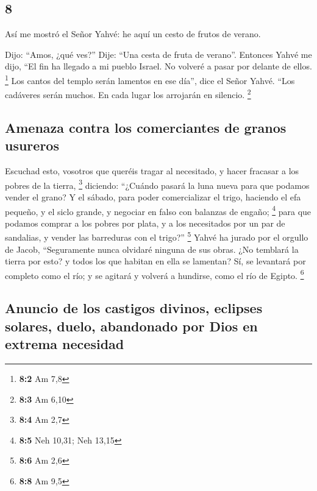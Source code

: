 \begin{paracol}{2}
\hypertarget{section-14}{%
\section{8}\label{section-14}}

 Así me mostró el Señor Yahvé: he aquí un cesto de frutos
de verano.

 Dijo: ``Amos, ¿qué ves?'' Dije: ``Una cesta de fruta de
verano''. Entonces Yahvé me dijo, ``El fin ha llegado a mi pueblo
Israel. No volveré a pasar por delante de ellos. \footnote{\textbf{8:2}
  Am 7,8}  Los cantos del templo serán lamentos en ese
día'', dice el Señor Yahvé. ``Los cadáveres serán muchos. En cada lugar
los arrojarán en silencio. \footnote{\textbf{8:3} Am 6,10}

\hypertarget{amenaza-contra-los-comerciantes-de-granos-usureros}{%
\subsection{Amenaza contra los comerciantes de granos
usureros}\label{amenaza-contra-los-comerciantes-de-granos-usureros}}

 Escuchad esto, vosotros que queréis tragar al necesitado,
y hacer fracasar a los pobres de la tierra, \footnote{\textbf{8:4} Am
  2,7}  diciendo: ``¿Cuándo pasará la luna nueva para que
podamos vender el grano? Y el sábado, para poder comercializar el trigo,
haciendo el efa pequeño, y el siclo grande, y negociar en falso con
balanzas de engaño; \footnote{\textbf{8:5} Neh 10,31; Neh 13,15}
 para que podamos comprar a los pobres por plata, y a los
necesitados por un par de sandalias, y vender las barreduras con el
trigo?'' \footnote{\textbf{8:6} Am 2,6}  Yahvé ha jurado
por el orgullo de Jacob, ``Seguramente nunca olvidaré ninguna de sus
obras.  ¿No temblará la tierra por esto? y todos los que
habitan en ella se lamentan? Sí, se levantará por completo como el río;
y se agitará y volverá a hundirse, como el río de Egipto. \footnote{\textbf{8:8}
  Am 9,5}

\hypertarget{anuncio-de-los-castigos-divinos-eclipses-solares-duelo-abandonado-por-dios-en-extrema-necesidad}{%
\subsection{Anuncio de los castigos divinos, eclipses solares, duelo,
abandonado por Dios en extrema
necesidad}\label{anuncio-de-los-castigos-divinos-eclipses-solares-duelo-abandonado-por-dios-en-extrema-necesidad}}


\end{paracol}
